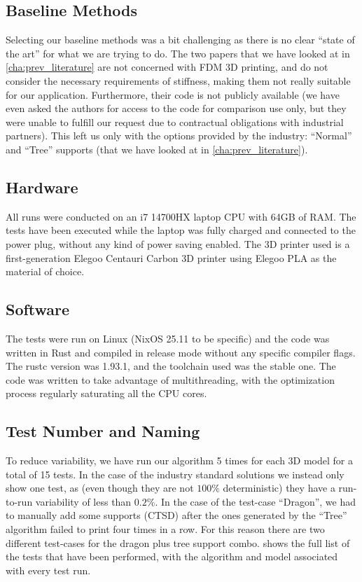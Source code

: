 \subsection{Baseline Methods}

Selecting our baseline methods was a bit challenging as there is no clear ``state of the art''
for what we are trying to do. The two papers that we have looked at in \cref{cha:prev_literature}
are not concerned with FDM 3D printing, and do not consider the necessary requirements of
stiffness, making them not really suitable for our application. Furthermore, their code is not publicly
available (we have even asked the authors for access to the code for comparison use only,
but they were unable to fulfill our request due to contractual obligations with industrial partners).
This left us only with the options provided by the industry: ``Normal'' and ``Tree'' supports (that we have
looked at in \cref{cha:prev_literature}).

\subsection{Hardware}

All runs were conducted on an i7 14700HX laptop CPU with 64GB of RAM.
The tests have been executed while the laptop was fully charged and connected to the power
plug, without any kind of power saving enabled.
The 3D printer used is a first-generation Elegoo Centauri Carbon 3D printer using
Elegoo PLA as the material of choice.

\subsection{Software}

The tests were run on Linux (NixOS 25.11 to be specific) and the code was 
written in Rust and compiled in release mode without any specific compiler flags.
The rustc version was 1.93.1, and the toolchain used was the stable one.
The code was written to take advantage of multithreading, with the optimization
process regularly saturating all the CPU cores.

\subsection{Test Number and Naming}

To reduce variability, we have run our algorithm 5 times for each 
3D model for a total of 15 tests. In the case of the industry standard solutions we
instead only show one test, as (even though they are not $100\%$ deterministic) they have a run-to-run variability of less than $0.2\%$.
In the case of the test-case ``Dragon'', we had to manually add some supports (CTSD) after
the ones generated by the ``Tree'' algorithm failed to print four times in a row.
For this reason there are two different test-cases for the dragon plus tree support combo.
 shows the full list of the tests that have been performed,
with the algorithm and model associated with every test run.


